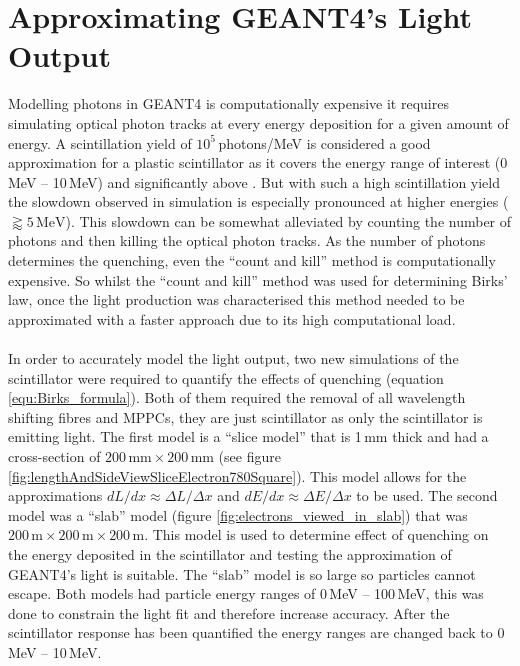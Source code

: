 \section{Approximating GEANT4's Light Output}\label{sec:GEANT4Simulation_MonteCarloBirksLaw}
Modelling photons in GEANT4 is computationally expensive it requires simulating optical photon tracks at every energy deposition for a given amount of energy. A scintillation yield of $10^5$\,photons/MeV is considered a good approximation for a plastic scintillator as it covers the energy range of interest (0\,MeV -- 10\,MeV) and significantly above \cite{craun_1970}. But with such a high scintillation yield the slowdown observed in simulation is especially pronounced at higher energies ($\gtrapprox 5\,\textrm{MeV}$). This slowdown can be somewhat alleviated by counting the number of photons and then killing the optical photon tracks. As the number of photons determines the quenching, even the ``count and kill'' method is computationally expensive. So whilst the ``count and kill'' method was used for determining Birks' law, once the light production was characterised this method needed to be approximated with a faster approach due to its high computational load.
\\\\In order to accurately model the light output, two new simulations of the scintillator were required to quantify the effects of quenching (equation \ref{equ:Birks_formula}). Both of them required the removal of all wavelength shifting fibres and MPPCs, they are just scintillator as only the scintillator is emitting light. The first model is a ``slice model'' that is 1\,mm thick and had a cross-section of $200\,\textrm{mm} \times 200\,\textrm{mm}$ (see figure \ref{fig:lengthAndSideViewSliceElectron780Square}). This model allows for the approximations $dL/dx \approx \Delta L / \Delta x$ and $dE/dx \approx \Delta E / \Delta x$ to be used. The second model was a ``slab'' model (figure \ref{fig:electrons_viewed_in_slab}) that was $200\,\textrm{m} \times 200\,\textrm{m} \times 200\,\textrm{m}$. This model is used to determine effect of quenching on the energy deposited in the scintillator and testing the approximation of GEANT4's light is suitable. The ``slab'' model is so large so particles cannot escape. Both models had particle energy ranges of 0\,MeV -- 100\,MeV, this was done to constrain the light fit and therefore increase accuracy. After the scintillator response has been quantified the energy ranges are changed back to 0\,MeV -- 10\,MeV. %

